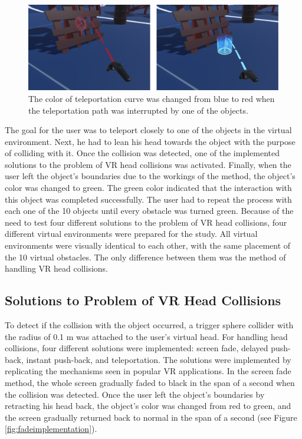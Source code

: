 \begin{figure}[th]
\centering
\includegraphics[width=1\textwidth]{img/implemented_teleportation.png}
\caption{The color of teleportation curve was changed from blue to red when the teleportation path was interrupted by one of the objects.}
\label{fig:tpimplementation}
\end{figure}

The goal for the user was to teleport closely to one of the objects in the virtual environment. Next, he had to lean his head towards the object with the purpose of colliding with it. Once the collision was detected, one of the implemented solutions to the problem of VR head collisions was activated. Finally, when the user left the object's boundaries due to the workings of the method, the object's color was changed to green. The green color indicated that the interaction with this object was completed successfully. The user had to repeat the process with each one of the 10 objects until every obstacle was turned green. Because of the need to test four different solutions to the problem of VR head collisions, four different  virtual environments were prepared for the study. All virtual environments were visually identical to each other, with the same placement of the 10 virtual obstacles. The only difference between them was the method of handling VR head collisions.

\subsection{Solutions to Problem of VR Head Collisions}

To detect if the collision with the object occurred, a trigger sphere collider \cite{SPHERECOLLIDER} with the radius of 0.1 m was attached to the user's virtual head. For handling head collisions, four different solutions were implemented: screen fade, delayed push-back, instant push-back, and teleportation. The solutions were implemented by replicating the mechanisms seen in popular VR applications. In the screen fade method, the whole screen gradually faded to black in the span of a second when the collision was detected. Once the user left the object's boundaries by retracting his head back, the object's color was changed from red to green, and the screen gradually returned back to normal in the span of a second (see Figure \ref{fig:fadeimplementation}). 

